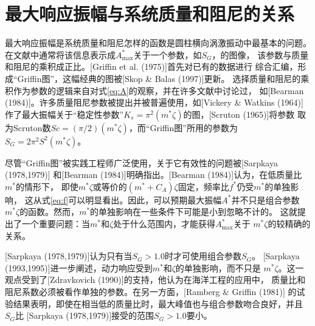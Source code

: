 \section{最大响应振幅与系统质量和阻尼的关系}
\label{sec:maxamp}

最大响应振幅是系统质量和阻尼怎样的函数是圆柱横向涡激振动中最基本的问题。
在文献中通常将该信息表示成$A^*_{\max}$关于一个参数，如$S_G$，的图像，
该参数与质量和阻尼的乘积成正比。[Griffin et al. (1975)]首先对已有的数据进行
综合汇编，形成``Griffin图''，这幅经典的图被[Skop \& Balas (1997)]更新。
选择质量和阻尼的乘积作为参数的逻辑来自对式\eqref{eq:A}的观察，并在许多文献中讨论过，
如[Bearman (1984)]。许多质量阻尼参数被提出并被普遍使用，如[Vickery \& Watkins (1964)]
作了最大振幅关于``稳定性参数''$K_s=\pi^2(m^*\zeta)$的图，[Scruton (1965)]将参数
取为Scruton数$Sc=(\pi/2)(m^*\zeta)$，而``Griffin图''所用的参数为
$S_G=2\pi^2S^2(m^*\zeta)$。

尽管``Griffin图''被实践工程师广泛使用，关于它有效性的问题被[Sarpkaya (1978,1979)]
和[Bearman (1984)]明确指出。[Bearman (1984)]认为，在低质量比$m^*$的情形下，
即使$m^*\zeta$或等价的$(m^*+C_A)\zeta$固定，频率比$f^*$仍受$m^*$的单独影响，
这从式\eqref{eq:f}可以明显看出。因此，可以预期最大振幅$A^*$并不只是组合参数
$m^*\zeta$的函数。然而，$m^*$的单独影响在一些条件下可能是小到忽略不计的。
这就提出了一个重要问题：当$m^*$和$\zeta$处于什么范围内，才能获得$A^*_{\max}$关于
$m^*\zeta$的较精确的关系。

[Sarpkaya (1978,1979)]认为只有当$S_G>1.0$时才可使用组合参数$S_G$。
[Sarpkaya (1993,1995)]进一步阐述，动力响应受到$m^*$和$\zeta$的单独影响，而不只是
$m^*\zeta$。这一观点受到了[Zdravkovich (1990)]的支持，他认为在海洋工程的应用中，
质量比和阻尼系数必须被看作单独的参数。在另一方面，[Ramberg \& Griffin (1981)]
的试验结果表明，即使在相当低的质量比时，最大峰值也与组合参数吻合良好，并且$S_G$比
[Sarpkaya (1978,1979)]接受的范围$S_G>1.0$要小。
